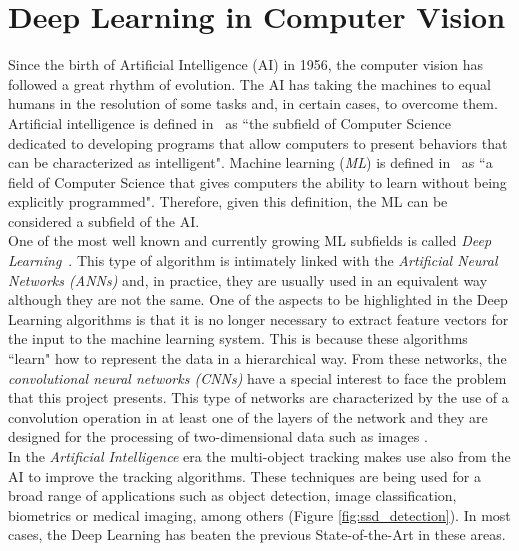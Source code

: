 \section{Deep Learning in Computer Vision}
Since the birth of Artificial Intelligence (AI) in 1956, the computer vision has followed a great rhythm of evolution. The AI has taking the machines to equal humans in the resolution of some tasks and, in certain cases, to overcome them.
Artificial intelligence is defined in~\cite{mccarthy2006proposal} as ``the subfield of Computer Science dedicated to developing programs that allow computers to present behaviors that can be characterized as intelligent". Machine learning (\textit{ML}) is defined in~\cite{samuel2000some} as ``a field of Computer Science that gives computers the ability to learn without being explicitly programmed". Therefore, given this definition, the ML can be considered a subfield of the AI.\\
One of the most well known and currently growing ML subfields is called \textit{Deep Learning}~\cite{deng2014deep}. This type of algorithm is intimately linked with the \textit{Artificial Neural Networks (ANNs)} and, in practice, they are usually used in an equivalent way although they are not the same. One of the aspects to be highlighted in the Deep Learning algorithms is that it is no longer necessary to extract feature vectors for the input to the machine learning system. This is because these algorithms ``learn" how to represent the data in a hierarchical way. From these networks, the \textit{convolutional neural networks (CNNs)} have a special interest to face the problem that this project presents. This type of networks are characterized by the use of a convolution operation in at least one of the layers of the network and they are designed for the processing of two-dimensional data such as images \cite{liu2015implementation}.\\
In the \textit{Artificial Intelligence} era the multi-object tracking makes use also from the AI to improve the tracking algorithms. These techniques are being used for a broad range of applications such as object detection, image classification, biometrics or medical imaging, among others (Figure \ref{fig:ssd_detection}). In most cases, the Deep Learning has beaten the previous State-of-the-Art in these areas.
